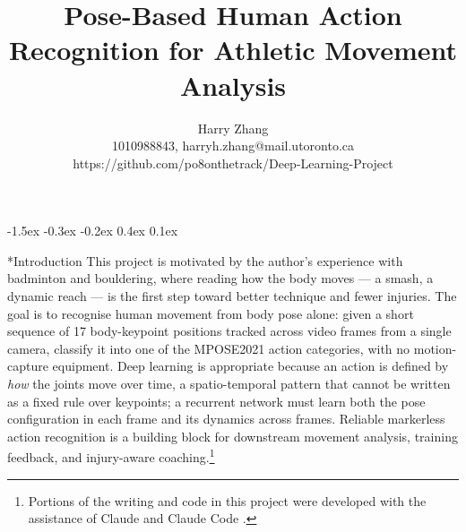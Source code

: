 \documentclass[final]{article}
\title{Pose-Based Human Action Recognition for Athletic Movement Analysis}
\author{%
  Harry Zhang\\
  1010988843, harryh.zhang@mail.utoronto.ca\\
  https://github.com/po8onthetrack/Deep-Learning-Project\\
}
\makeatletter
\renewcommand{\section}{%
  \@startsection{section}{1}{\z@}%
                {-1.5ex \@plus -0.3ex \@minus -0.2ex}%
                {0.4ex \@plus 0.1ex}%
                {\large\bf\raggedright}%
}
\makeatother
\begin{document}
\maketitle
\vspace{-0.45in}

\section*{Introduction}
This project is motivated by the author's experience with badminton and bouldering, where reading how the body moves --- a smash, a dynamic reach --- is the first step toward better technique and fewer injuries. The goal is to recognise human movement from body pose alone: given a short sequence of 17 body-keypoint positions tracked across video frames from a single camera, classify it into one of the MPOSE2021 action categories, with no motion-capture equipment. Deep learning is appropriate because an action is defined by \emph{how} the joints move over time, a spatio-temporal pattern that cannot be written as a fixed rule over keypoints; a recurrent network must learn both the pose configuration in each frame and its dynamics across frames. Reliable markerless action recognition is a building block for downstream movement analysis, training feedback, and injury-aware coaching.\footnote{Portions of the writing and code in this project were developed with the assistance of Claude \citep{anthropic2026claude} and Claude Code \citep{anthropic2026claudecode}.}
\end{document}
